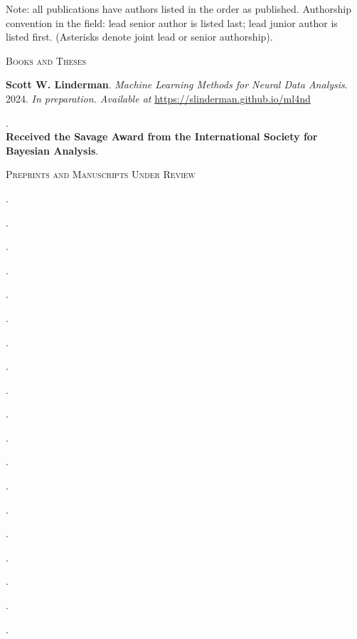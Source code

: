 \documentclass[10pt]{article}
\renewcommand{\section}[1]{\pagebreak[3]%
    \hyphenpenalty=10000%
    \vspace{1.3\baselineskip}%
    \noindent\llap{\scshape\smash{\parbox[t]{\marginparwidth}{\raggedright #1}}}%
    \vspace{-\baselineskip}\par}
\begin{document}
\section{Publications}

Note: all publications have authors listed in the order as published. Authorship convention in the field: lead senior author is listed last; lead junior author is listed first. (Asterisks denote joint lead or senior authorship).

\vspace{.5em}

{\small\scshape Books and Theses}
\begin{outerlist}
\item \textbf{Scott W. Linderman}. \textit{Machine Learning Methods for Neural Data Analysis}. 2024. \textit{In preparation. Available at} \url{https://slinderman.github.io/ml4nd}
\item {}. \\
  \textbf{Received the Savage Award from the International Society for Bayesian Analysis}. 
\end{outerlist}

\vspace{0.5em}

{\small\scshape Preprints and Manuscripts Under Review}
\begin{outerlist}
\item {}.
\item {}.
\item {}.
\item {}.
\item {}.
\item {}.
\item {}.
\item {}.
\item {}.
\item {}.
\item {}.
\item {}.
\item {}.
\item {}.
\item {}.
\item {}.
\item {}.
\item {}.
\item {}.
\end{outerlist}
\end{document}
